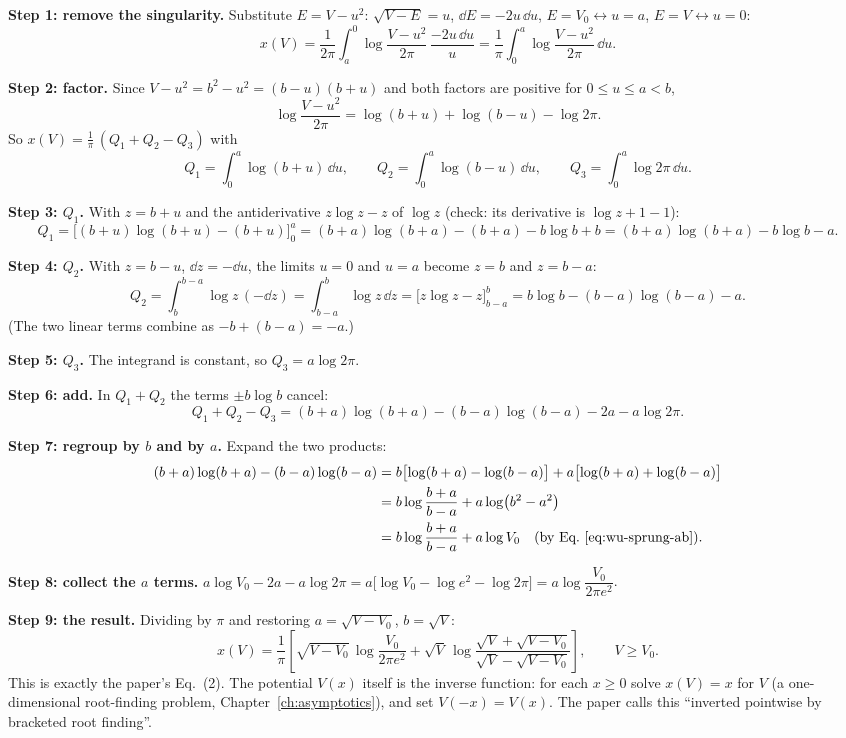 \textbf{Step 1: remove the singularity.} Substitute $E=V-u^2$: $\sqrt{V-E}=u$, $\dd E=-2u\,\dd u$, $E=V_0\leftrightarrow u=a$, $E=V\leftrightarrow u=0$:
\begin{equation}
x(V)=\frac{1}{2\pi}\int_{a}^{0}\log\frac{V-u^2}{2\pi}\,\frac{-2u\,\dd u}{u}=\frac1\pi\int_0^{a}\log\frac{V-u^2}{2\pi}\,\dd u .
\label{eq:wu-sprung-xu}
\end{equation}

\textbf{Step 2: factor.} Since $V-u^2=b^2-u^2=(b-u)(b+u)$ and both factors are positive for $0\le u\le a<b$,
\[
\log\frac{V-u^2}{2\pi}=\log(b+u)+\log(b-u)-\log 2\pi .
\]
So $x(V)=\frac1\pi\,(Q_1+Q_2-Q_3)$ with
\[
Q_1=\int_0^a\log(b+u)\,\dd u,\qquad Q_2=\int_0^a\log(b-u)\,\dd u,\qquad Q_3=\int_0^a\log2\pi\,\dd u .
\]

\textbf{Step 3: $Q_1$.} With $z=b+u$ and the antiderivative $z\log z-z$ of $\log z$ (check: its derivative is $\log z+1-1$):
\[
Q_1=\bigl[(b+u)\log(b+u)-(b+u)\bigr]_0^a=(b+a)\log(b+a)-(b+a)-b\log b+b=(b+a)\log(b+a)-b\log b-a .
\]

\textbf{Step 4: $Q_2$.} With $z=b-u$, $\dd z=-\dd u$, the limits $u=0$ and $u=a$ become $z=b$ and $z=b-a$:
\[
Q_2=\int_{b}^{b-a}\log z\,(-\dd z)=\int_{b-a}^{b}\log z\,\dd z=\bigl[z\log z-z\bigr]_{b-a}^{b}=b\log b-(b-a)\log(b-a)-a .
\]
(The two linear terms combine as $-b+(b-a)=-a$.)

\textbf{Step 5: $Q_3$.} The integrand is constant, so $Q_3=a\log2\pi$.

\textbf{Step 6: add.} In $Q_1+Q_2$ the terms $\pm b\log b$ cancel:
\[
Q_1+Q_2-Q_3=(b+a)\log(b+a)-(b-a)\log(b-a)-2a-a\log2\pi .
\]

\textbf{Step 7: regroup by $b$ and by $a$.} Expand the two products:
\begin{align*}
(b+a)\log(b+a)-(b-a)\log(b-a)&=b\bigl[\log(b+a)-\log(b-a)\bigr]+a\bigl[\log(b+a)+\log(b-a)\bigr]\\
&=b\log\frac{b+a}{b-a}+a\log\bigl(b^2-a^2\bigr)\\
&=b\log\frac{b+a}{b-a}+a\log V_0\quad\text{(by Eq.~\eqref{eq:wu-sprung-ab})}.
\end{align*}

\textbf{Step 8: collect the $a$ terms.} $a\log V_0-2a-a\log2\pi=a\bigl[\log V_0-\log e^2-\log 2\pi\bigr]=a\log\dfrac{V_0}{2\pi e^2}$.

\textbf{Step 9: the result.} Dividing by $\pi$ and restoring $a=\sqrt{V-V_0}$, $b=\sqrt V$:
\begin{equation}
\boxed{\;x(V)=\frac1\pi\left[\sqrt{V-V_0}\,\log\frac{V_0}{2\pi e^2}+\sqrt V\,\log\frac{\sqrt V+\sqrt{V-V_0}}{\sqrt V-\sqrt{V-V_0}}\right],\qquad V\ge V_0 .\;}
\label{eq:wu-sprung-ws}
\end{equation}
This is exactly the paper's Eq.~(2). The potential $V(x)$ itself is the inverse function: for each $x\ge0$ solve $x(V)=x$ for $V$ (a one-dimensional root-finding problem, Chapter~\ref{ch:asymptotics}), and set $V(-x)=V(x)$. The paper calls this ``inverted pointwise by bracketed root finding''.

